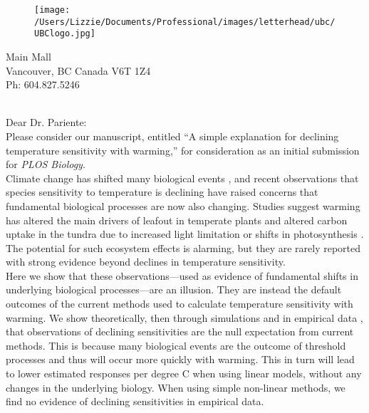 \documentclass[11pt,a4paper]{article}
\begin{document}

\begin{figure}[htbp]
\hspace*{14cm}                                                           
\texttt{[image: /Users/Lizzie/Documents/Professional/images/letterhead/ubc/UBClogo.jpg]}
\end{figure}
\vspace{-10ex}
\begin{small}
 Main Mall \\
\noindent Vancouver, BC Canada V6T 1Z4\\
\noindent Ph: 604.827.5246\\
\end{small}
\vspace{2ex}\\
\noindent Dear Dr. Pariente:
\vspace{1.5ex}\\
Please consider our manuscript, entitled ``A simple explanation for declining temperature sensitivity with warming,'' for consideration as an initial submission for \emph{PLOS Biology}. %
\vspace{1.5ex}\\
Climate change has shifted many biological events \citep{IPCC:2014sm}, and recent observations that species sensitivity to temperature is declining have raised concerns that fundamental biological processes are now also changing. Studies suggest warming has altered the main drivers of leafout in temperate plants \citep{fu2015,gusewell2017,Samplonius:2018aa,vitasse2018} and altered carbon uptake in the tundra due to increased light limitation or shifts in photosynthesis \citep{piao2017,Zhu2019}. The potential for such ecosystem effects is alarming, but they are rarely reported with strong evidence beyond declines in temperature sensitivity.
\vspace{1.5ex}\\
Here we show that these observations---used as evidence of fundamental shifts in underlying biological processes---are an illusion. They are instead the default outcomes of the current methods used to calculate temperature sensitivity with warming. We show theoretically, then through simulations and in empirical data \citep[using the same dataset used in][]{fu2015}, that observations of declining sensitivities are the null expectation from current methods. This is because many biological events are the outcome of threshold processes and thus will occur more quickly with warming. This in turn will lead to lower estimated responses per degree C when using linear models, without any changes in the underlying biology. When using simple non-linear methods, we find no evidence of declining sensitivities in empirical data. %
\end{document}

